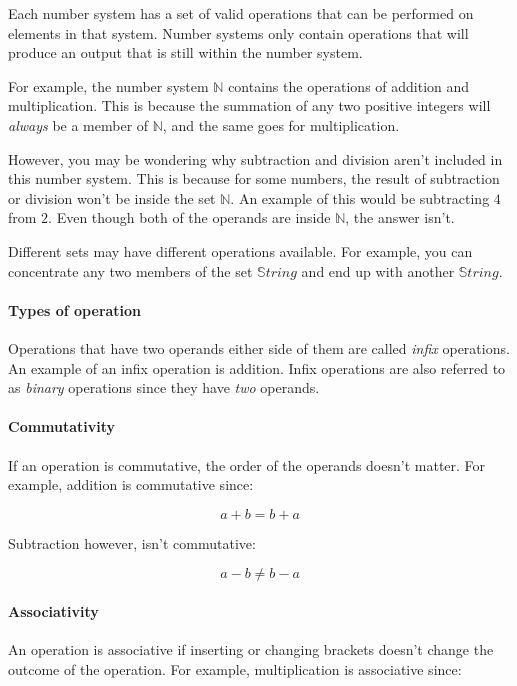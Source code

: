 \documentclass{article}
\begin{document}
Each number system has a set of valid operations that can be performed on elements in that system. Number systems only contain operations that will produce an output that is still within the number system.

For example, the number system $\mathbb{N}$ contains the operations of addition and multiplication. This is because the summation of any two positive integers will {\it always} be a member of $\mathbb{N}$, and the same goes for multiplication.

However, you may be wondering why subtraction and division aren't included in this number system. This is because for some numbers, the result of subtraction or division won't be inside the set $\mathbb{N}$. An example of this would be subtracting $4$ from $2$. Even though both of the operands are inside $\mathbb{N}$, the answer isn't.

Different sets may have different operations available. For example, you can concentrate any two members of the set $\mathbb{S}tring$ and end up with another $\mathbb{S}tring$.

\paragraph{Types of operation}

Operations that have two operands either side of them are called {\it infix} operations. An example of an infix operation is addition. Infix operations are also referred to as {\it binary} operations since they have {\it two} operands.

\paragraph{Commutativity}

If an operation is commutative, the order of the operands doesn't matter. For example, addition is commutative since:

\[
	a + b = b + a
\]

Subtraction however, isn't commutative:

\[
	a - b \neq b - a
\]

\paragraph{Associativity}

An operation is associative if inserting or changing brackets doesn't change the outcome of the operation. For example, multiplication is associative since:
\end{document}
